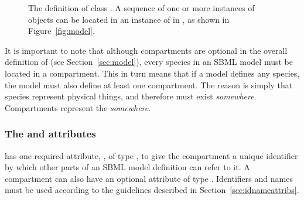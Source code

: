 \begin{figure}[htb]
  \centering
  \small
  \vspace*{-1ex}
  \caption{The definition of class \Compartment.  A
      sequence of one or more instances of \Compartment objects
      can be located in an instance of \ListOfCompartments in
      \Model, as shown in Figure~\protect\ref{fig:model}.}
  \label{fig:compartment}
\end{figure}

It is important to note that although compartments are optional in
the overall definition of \Model (see Section~\ref{sec:model}),
every species in an SBML model must be located in a compartment.
This in turn means that if a model defines any species, the model
must also define at least one compartment.  The reason is simply
that species represent physical things, and therefore must exist
\emph{somewhere}.  Compartments represent the \emph{somewhere}.


\subsubsection{The  and  attributes}

\Compartment has one required attribute, , of type
, to give the compartment a unique identifier by
which other parts of an SBML model definition can refer to it.  A
compartment can also have an optional  attribute of type
.  Identifiers and names must be used according
to the guidelines described in Section~\ref{sec:idnameattribs}.



